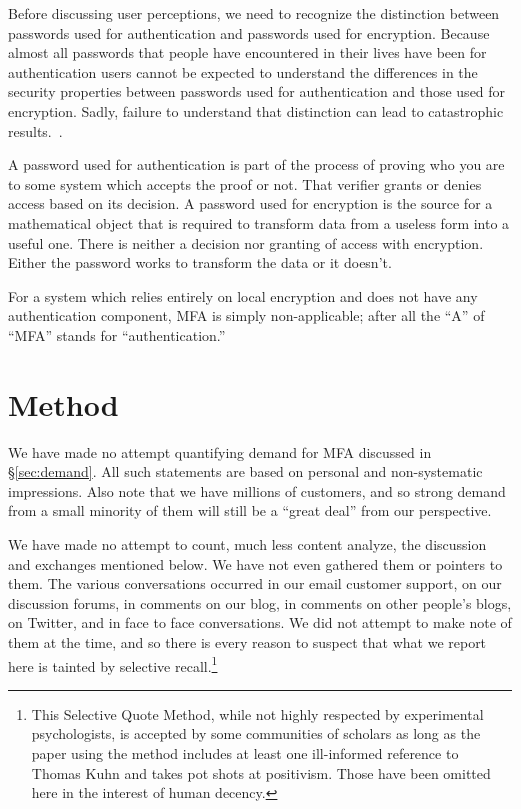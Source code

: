 \documentclass{soups}
\begin{document}
Before discussing user perceptions, we need to recognize the distinction between passwords used for authentication and passwords used for encryption.
Because almost all passwords that people have encountered in their lives have been for authentication users cannot be expected to understand the differences in the security properties between passwords used for authentication and those used for encryption.
Sadly, failure to understand that distinction can lead to catastrophic results.~\autocite{Blaze2011:cablegate}.

A password used for authentication is part of the process of proving who you are to some system which accepts the proof or not. That verifier grants or denies access based on its decision. A password used for encryption is the source for a mathematical object that is required to transform data from a useless form into a useful one. There is neither a decision nor granting of access with encryption. Either the password works to transform the data or it doesn't.

For a system which relies entirely on local encryption and does not have any authentication component, MFA is simply non-applicable;
after all the “A” of “MFA” stands for “authentication.” 

\section{Method}

We have made no attempt quantifying demand for MFA discussed in \S\ref{sec:demand}.
All such statements are based on personal and non-systematic impressions.
Also note that we have millions of customers,
and so strong demand from a small minority of them will still be a “great deal” from our perspective.

We have made no attempt to count, much less content analyze, the discussion and exchanges mentioned below.
We have not even gathered them or pointers to them.
The various conversations occurred in our email customer support,
on our discussion forums,
in comments on our blog,
in comments on other people's blogs,
on Twitter,
and in face to face conversations. 
We did not attempt to make note of them at the time,
and so there is every reason to suspect that what we report here is tainted by selective recall.\footnote
  {This Selective Quote Method,
  while not highly respected by experimental psychologists,
  is accepted by some communities of scholars
  as long as the paper using the method includes
  at least one ill-informed reference to Thomas Kuhn
  and takes pot shots at positivism.
  Those have been omitted here in the interest of human decency.}
\end{document}
